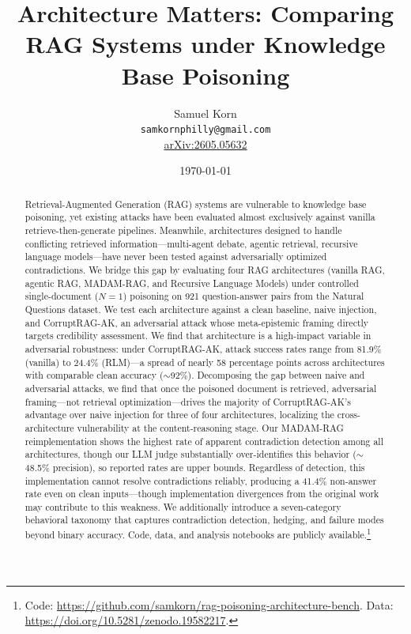 \documentclass[11pt]{article}
\title{Architecture Matters: Comparing RAG Systems under Knowledge Base Poisoning}
\author{
  Samuel Korn \\
  \texttt{samkornphilly@gmail.com} \\
  \href{https://arxiv.org/abs/2605.05632}{arXiv:2605.05632}
}
\date{\today}
\begin{document}
\maketitle


\begin{abstract}
Retrieval-Augmented Generation (RAG) systems are vulnerable to knowledge base poisoning, yet existing attacks have been evaluated almost exclusively against vanilla retrieve-then-generate pipelines. Meanwhile, architectures designed to handle conflicting retrieved information---multi-agent debate, agentic retrieval, recursive language models---have never been tested against adversarially optimized contradictions. We bridge this gap by evaluating four RAG architectures (vanilla RAG, agentic RAG, MADAM-RAG, and Recursive Language Models) under controlled single-document ($N{=}1$) poisoning on 921 question-answer pairs from the Natural Questions dataset. We test each architecture against a clean baseline, naive injection, and CorruptRAG-AK, an adversarial attack whose meta-epistemic framing directly targets credibility assessment. We find that architecture is a high-impact variable in adversarial robustness: under CorruptRAG-AK, attack success rates range from 81.9\% (vanilla) to 24.4\% (RLM)---a spread of nearly 58 percentage points across architectures with comparable clean accuracy (${\sim}$92\%). Decomposing the gap between naive and adversarial attacks, we find that once the poisoned document is retrieved, adversarial framing---not retrieval optimization---drives the majority of CorruptRAG-AK's advantage over naive injection for three of four architectures, localizing the cross-architecture vulnerability at the content-reasoning stage. Our MADAM-RAG reimplementation shows the highest rate of apparent contradiction detection among all architectures, though our LLM judge substantially over-identifies this behavior (${\sim}$48.5\% precision), so reported rates are upper bounds. Regardless of detection, this implementation cannot resolve contradictions reliably, producing a 41.4\% non-answer rate even on clean inputs---though implementation divergences from the original work may contribute to this weakness. We additionally introduce a seven-category behavioral taxonomy that captures contradiction detection, hedging, and failure modes beyond binary accuracy. Code, data, and analysis notebooks are publicly available.\footnote{Code: \url{https://github.com/samkorn/rag-poisoning-architecture-bench}. Data: \url{https://doi.org/10.5281/zenodo.19582217}.}
\end{abstract}
\end{document}
